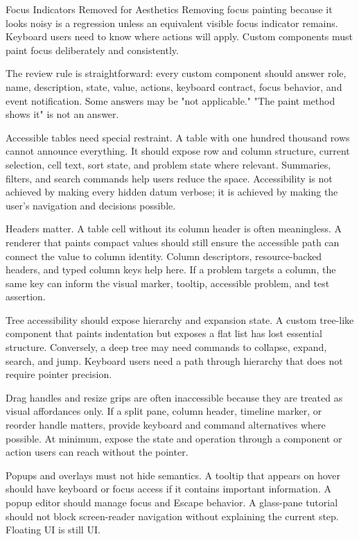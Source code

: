 \begin{pitfallbox}{Focus Indicators Removed for Aesthetics}
Removing focus painting because it looks noisy is a regression unless an equivalent visible focus indicator remains. Keyboard users need to know where actions will apply. Custom components must paint focus deliberately and consistently.
\end{pitfallbox}

The review rule is straightforward: every custom component should answer role, name, description, state, value, actions, keyboard contract, focus behavior, and event notification. Some answers may be "not applicable." "The paint method shows it" is not an answer.

Accessible tables need special restraint. A table with one hundred thousand rows cannot announce everything. It should expose row and column structure, current selection, cell text, sort state, and problem state where relevant. Summaries, filters, and search commands help users reduce the space. Accessibility is not achieved by making every hidden datum verbose; it is achieved by making the user's navigation and decisions possible.

Headers matter. A table cell without its column header is often meaningless. A renderer that paints compact values should still ensure the accessible path can connect the value to column identity. Column descriptors, resource-backed headers, and typed column keys help here. If a problem targets a column, the same key can inform the visual marker, tooltip, accessible problem, and test assertion.

Tree accessibility should expose hierarchy and expansion state. A custom tree-like component that paints indentation but exposes a flat list has lost essential structure. Conversely, a deep tree may need commands to collapse, expand, search, and jump. Keyboard users need a path through hierarchy that does not require pointer precision.

Drag handles and resize grips are often inaccessible because they are treated as visual affordances only. If a split pane, column header, timeline marker, or reorder handle matters, provide keyboard and command alternatives where possible. At minimum, expose the state and operation through a component or action users can reach without the pointer.

Popups and overlays must not hide semantics. A tooltip that appears on hover should have keyboard or focus access if it contains important information. A popup editor should manage focus and Escape behavior. A glass-pane tutorial should not block screen-reader navigation without explaining the current step. Floating UI is still UI.

